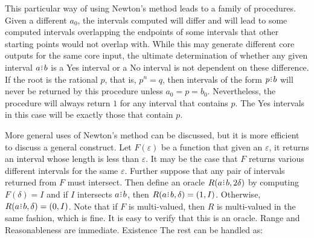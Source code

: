 \documentclass[12pt]{article}
\begin{document}
This particular way of using Newton's method leads to a family of procedures. Given a different $a_0$, the intervals computed will differ and will lead to some computed intervals overlapping the endpoints of some intervals that other starting points would not overlap with. While this may generate different core outputs for the same core input, the ultimate determination of whether any given interval $a\rint b$ is a Yes interval or a No interval is not dependent on these difference.  If the root is the rational $p$, that is, $p^n = q$,  then intervals of the form $p\rint b$ will never be returned by this procedure unless $a_0 = p = b_0$. Nevertheless, the procedure will always return $1$ for any interval that contains $p$. The Yes intervals in this case will be exactly those that contain $p$. 

More general uses of Newton's method can be discussed, but it is more efficient to discuss a general construct. Let $F(\varepsilon)$ be a function that given an $\varepsilon$, it returns an interval whose length is less than $\varepsilon$. It may be the case that $F$ returns various different intervals for the same $\varepsilon$. Further suppose that any pair of intervals returned from $F$ must intersect. Then define an oracle $R(a\rint b, 2\delta)$ by computing $F(\delta) = I$ and if $I$ intersects $a\rint b$, then $R(a\rint b, \delta) = (1, I)$. Otherwise, $R(a\rint b, \delta) = (0, I)$. Note that if $F$ is multi-valued, then $R$ is multi-valued in the same fashion, which is fine. It is easy to verify that this is an oracle. Range and Reasonableness are immediate. Existence The rest can be handled as:
\end{document}
